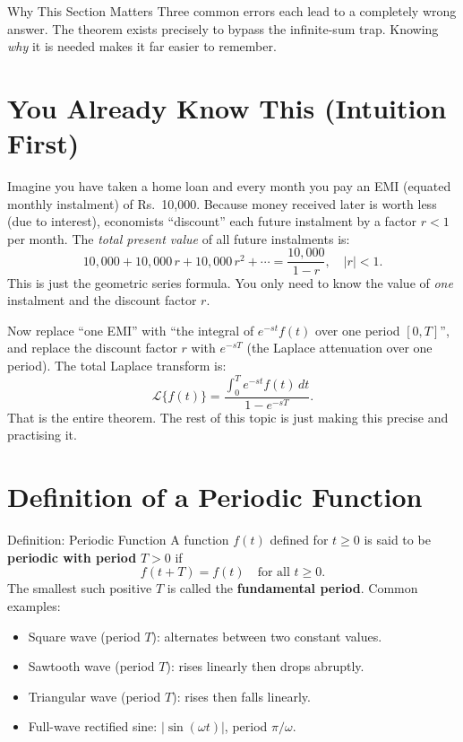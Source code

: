 \documentclass[12pt,a4paper]{article}
\begin{document}
\begin{learnbox}{Why This Section Matters}
Three common errors each lead to a completely wrong answer. The theorem exists
precisely to bypass the infinite-sum trap. Knowing \emph{why} it is needed
makes it far easier to remember.
\end{learnbox}

\section{You Already Know This (Intuition First)}

Imagine you have taken a home loan and every month you pay an EMI (equated
monthly instalment) of Rs.\ 10{,}000. Because money received later is worth
less (due to interest), economists ``discount'' each future instalment by a
factor $r < 1$ per month. The \emph{total present value} of all future
instalments is:
\[
  10{,}000 + 10{,}000\,r + 10{,}000\,r^2 + \cdots
  = \frac{10{,}000}{1 - r}, \quad |r| < 1.
\]
This is just the geometric series formula. You only need to know the value of
\emph{one} instalment and the discount factor $r$.

Now replace ``one EMI'' with ``the integral of $e^{-st}f(t)$ over one period
$[0,T]$'', and replace the discount factor $r$ with $e^{-sT}$ (the Laplace
attenuation over one period). The total Laplace transform is:
\[
  \mathcal{L}\{f(t)\}
  = \frac{\displaystyle\int_0^T e^{-st} f(t)\,dt}{1 - e^{-sT}}.
\]
That is the entire theorem. The rest of this topic is just making this precise
and practising it.

\section{Definition of a Periodic Function}

\begin{infobox}{Definition: Periodic Function}
A function $f(t)$ defined for $t \ge 0$ is said to be \textbf{periodic with
period} $T > 0$ if
\[
  f(t + T) = f(t) \quad \text{for all } t \ge 0.
\]
The smallest such positive $T$ is called the \textbf{fundamental period}.
Common examples:
\begin{itemize}[noitemsep]
  \item Square wave (period $T$): alternates between two constant values.
  \item Sawtooth wave (period $T$): rises linearly then drops abruptly.
  \item Triangular wave (period $T$): rises then falls linearly.
  \item Full-wave rectified sine: $|\sin(\omega t)|$, period $\pi/\omega$.
\end{itemize}
\end{infobox}
\end{document}

